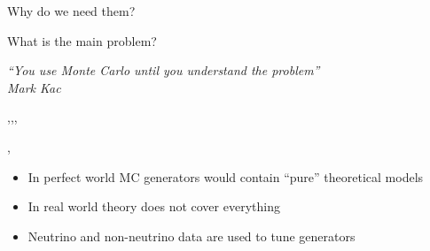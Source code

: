 \begin{slide}[toc=]{Why do we need them?}
\null\vfill

  \centering

\vfill\null
\end{slide}

\begin{slide}[toc=The main problem]{What is the main problem?}
\null\vfill

  {\it\color{pdcolor3}\hfill ``You use Monte Carlo until you understand the problem''}\\
  {\it\color{pdcolor3}\hfill Mark Kac}

  \sep\sep\sep
  
  \twocolumn
  {
    \sep
  
    \begin{itemize}
      \item In perfect world MC generators would contain ``pure'' theoretical models
      \item In real world theory does not cover everything
      \item Neutrino and non-neutrino data are used to tune generators
    \end{itemize}
  }
  {
    \centering
  }
  
\vfill\null
\end{slide}

